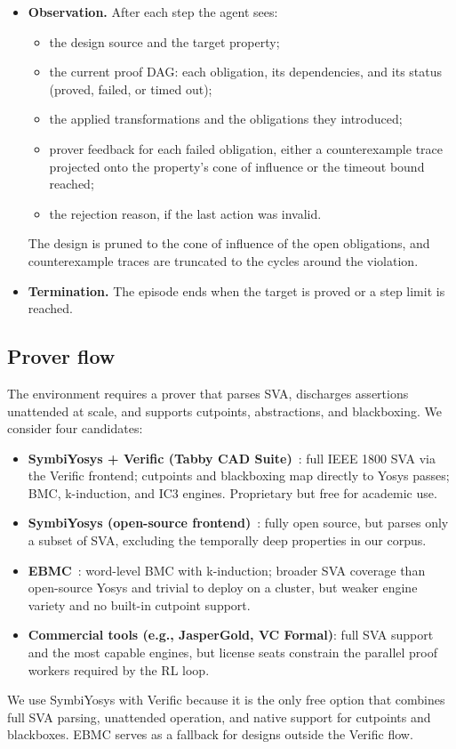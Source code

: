 \begin{itemize}[nosep]
    \item \textbf{Observation.} After each step the agent sees:
    \begin{itemize}[nosep]
        \item the design source and the target property;
        \item the current proof DAG: each obligation, its dependencies, and its status (proved, failed, or timed out);
        \item the applied transformations and the obligations they introduced;
        \item prover feedback for each failed obligation, either a counterexample trace projected onto the property's cone of influence or the timeout bound reached;
        \item the rejection reason, if the last action was invalid.
    \end{itemize}
    The design is pruned to the cone of influence of the open obligations, and
    counterexample traces are truncated to the cycles around the violation.

    \item \textbf{Termination.} The episode ends when the target is proved or a step limit is reached.
\end{itemize}

\subsection{Prover flow}
\label{sec:prover}

The environment requires a prover that parses SVA, discharges assertions unattended at scale, and supports cutpoints, abstractions, and blackboxing. We consider four candidates:
\begin{itemize}[nosep]
  \item \textbf{SymbiYosys + Verific (Tabby CAD Suite)}~\cite{symbiyosys}:
    full IEEE 1800 SVA via the Verific frontend; cutpoints and blackboxing map
    directly to Yosys passes; BMC, k-induction, and IC3 engines. Proprietary
    but free for academic use.
  \item \textbf{SymbiYosys (open-source frontend)}~\cite{symbiyosys}: fully
    open source, but parses only a subset of SVA, excluding the temporally
    deep properties in our corpus.
  \item \textbf{EBMC}~\cite{ebmc}: word-level BMC with k-induction; broader
    SVA coverage than open-source Yosys and trivial to deploy on a cluster,
    but weaker engine variety and no built-in cutpoint support.
  \item \textbf{Commercial tools (e.g., JasperGold, VC Formal)}: full SVA
    support and the most capable engines, but license seats constrain the
    parallel proof workers required by the RL loop.
\end{itemize}
We use SymbiYosys with Verific because it is the only free option that combines full SVA parsing, unattended operation, and native support for cutpoints and blackboxes. EBMC serves as a fallback for designs outside the Verific flow.

